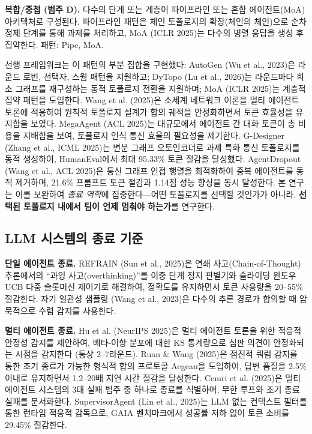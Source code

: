 \documentclass[a4paper,11pt]{article}
\begin{document}
\textbf{복합/중첩 (범주 D).} 다수의 단계 또는 계층이 파이프라인 또는 혼합 에이전트(MoA) 아키텍처로 구성된다. 파이프라인 패턴은 체인 토폴로지의 확장(체인의 체인)으로 순차 정제 단계를 통해 과제를 처리하고, MoA (ICLR 2025)는 다수의 병렬 응답을 생성 후 집약한다. 패턴: Pipe, MoA.

선행 프레임워크는 이 패턴의 부분 집합을 구현했다: AutoGen (Wu et al., 2023)은 라운드 로빈, 선택자, 스웜 패턴을 지원하고; DyTopo (Lu et al., 2026)는 라운드마다 희소 그래프를 재구성하는 동적 토폴로지 전환을 지원하며; MoA (ICLR 2025)는 계층적 집약 패턴을 도입한다. Wang et al. (2025)은 소세계 네트워크 이론을 멀티 에이전트 토론에 적용하여 원칙적 토폴로지 설계가 합의 궤적을 안정화하면서 토큰 효율성을 유지함을 보였다. MegaAgent (ACL 2025)는 대규모에서 에이전트 간 대화 토큰이 총 비용을 지배함을 보여, 토폴로지 인식 통신 효율의 필요성을 제기한다. G-Designer (Zhang et al., ICML 2025)는 변분 그래프 오토인코더로 과제 특화 통신 토폴로지를 동적 생성하여, HumanEval에서 최대 95.33\% 토큰 절감을 달성했다. AgentDropout (Wang et al., ACL 2025)은 통신 그래프 인접 행렬을 최적화하여 중복 에이전트를 동적 제거하며, 21.6\% 프롬프트 토큰 절감과 1.14점 성능 향상을 동시 달성한다. 본 연구는 이를 보완하여 \emph{종료 역학}에 집중한다---어떤 토폴로지를 선택할 것인가가 아니라, \textbf{선택된 토폴로지 내에서 팀이 언제 멈춰야 하는가}를 연구한다.

\subsection{LLM 시스템의 종료 기준}

\textbf{단일 에이전트 종료.} REFRAIN (Sun et al., 2025)은 연쇄 사고(Chain-of-Thought) 추론에서의 ``과잉 사고(overthinking)''를 이중 단계 정지 판별기와 슬라이딩 윈도우 UCB 다중 슬롯머신 제어기로 해결하여, 정확도를 유지하면서 토큰 사용량을 20--55\% 절감한다. 자기 일관성 샘플링 (Wang et al., 2023)은 다수의 추론 경로가 합의할 때 암묵적으로 수렴 감지를 사용한다.

\textbf{멀티 에이전트 종료.} Hu et al. (NeurIPS 2025)은 멀티 에이전트 토론을 위한 적응적 안정성 감지를 제안하여, 베타-이항 분포에 대한 KS 통계량으로 심판 의견이 안정화되는 시점을 감지한다 (통상 2--7라운드). Ruan \& Wang (2025)은 점진적 쿼럼 감지를 통한 조기 종료가 가능한 형식적 합의 프로토콜 Aegean을 도입하여, 답변 품질을 2.5\% 이내로 유지하면서 1.2--20배 지연 시간 절감을 달성한다. Cemri et al. (2025)은 멀티 에이전트 시스템의 3대 실패 범주 중 하나로 종료를 식별하며, 무한 루프와 조기 종료 실패를 문서화한다. SupervisorAgent (Lin et al., 2025)는 LLM 없는 컨텍스트 필터를 통한 런타임 적응적 감독으로, GAIA 벤치마크에서 성공률 저하 없이 토큰 소비를 29.45\% 절감한다.
\end{document}
